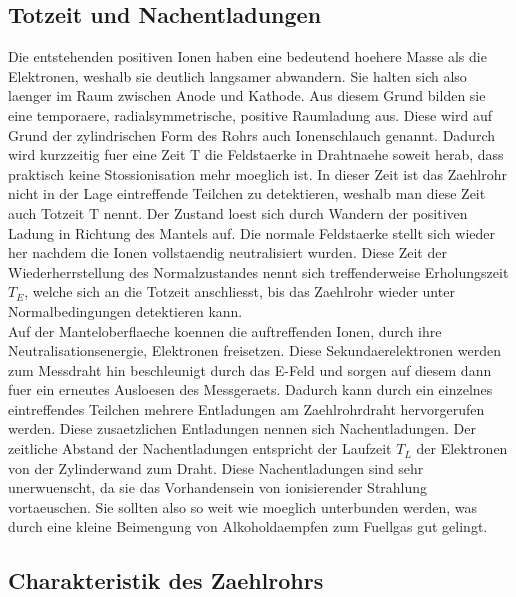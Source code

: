 \documentclass[titlepage=firstcover, captions=tableheading]{scrartcl}
\begin{document}
\subsection{Totzeit und Nachentladungen}
Die entstehenden positiven Ionen haben eine bedeutend hoehere Masse als die Elektronen, weshalb sie deutlich langsamer abwandern. Sie halten sich also laenger im Raum zwischen Anode und Kathode. Aus diesem Grund bilden sie eine temporaere, radialsymmetrische, positive Raumladung aus. Diese wird auf Grund der zylindrischen Form des Rohrs auch Ionenschlauch genannt. Dadurch wird kurzzeitig fuer eine Zeit T die Feldstaerke in Drahtnaehe soweit herab, dass praktisch keine Stossionisation mehr moeglich ist. In dieser Zeit ist das Zaehlrohr nicht in der Lage eintreffende Teilchen zu detektieren, weshalb man diese Zeit auch Totzeit T nennt. Der Zustand loest sich durch Wandern der positiven Ladung in Richtung des Mantels auf. Die normale Feldstaerke stellt sich wieder her nachdem die Ionen vollstaendig neutralisiert wurden. Diese Zeit der Wiederherrstellung des Normalzustandes nennt sich treffenderweise Erholungszeit $T_E$, welche sich an die Totzeit anschliesst, bis das Zaehlrohr wieder unter Normalbedingungen detektieren kann.\\
Auf der Manteloberflaeche koennen die auftreffenden Ionen, durch ihre Neutralisationsenergie, Elektronen freisetzen. Diese Sekundaerelektronen werden zum Messdraht hin beschleunigt durch das E-Feld und sorgen auf diesem dann fuer ein erneutes Ausloesen des Messgeraets. Dadurch kann durch ein einzelnes eintreffendes Teilchen mehrere Entladungen am  Zaehlrohrdraht hervorgerufen werden. Diese zusaetzlichen Entladungen nennen sich Nachentladungen. Der zeitliche Abstand der Nachentladungen entspricht der Laufzeit $T_L$ der Elektronen von der Zylinderwand zum Draht. Diese Nachentladungen sind sehr unerwuenscht, da sie das Vorhandensein von ionisierender Strahlung vortaeuschen. Sie sollten also so weit wie moeglich unterbunden werden, was durch eine kleine Beimengung von Alkoholdaempfen zum Fuellgas gut gelingt.
\subsection{Charakteristik des Zaehlrohrs}
\end{document}

